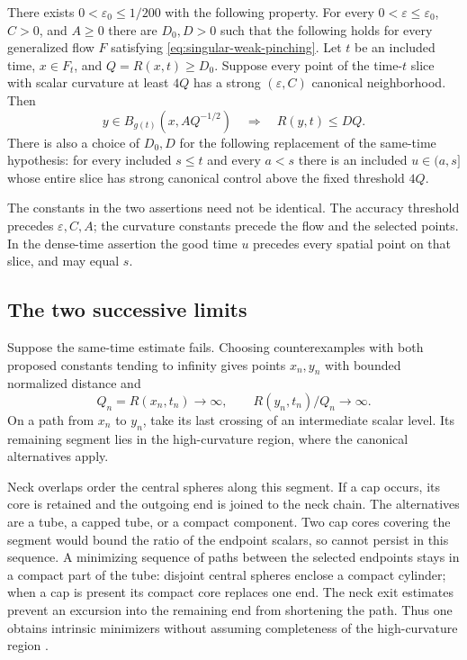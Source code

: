 \begin{theorem}
\label{thm:singular-bounded-distance}
There exists $0<\varepsilon_0\leq1/200$ with the following property.
For every $0<\varepsilon\leq\varepsilon_0$, $C>0$, and $A\geq0$ there
are $D_0,D>0$ such that the following holds for every generalized flow $F$
satisfying \eqref{eq:singular-weak-pinching}. Let $t$ be an included time,
$x\in F_t$, and $Q=R(x,t)\geq D_0$. Suppose every point of the time-$t$
slice with scalar curvature at least $4Q$ has a strong
$(\varepsilon,C)$ canonical neighborhood. Then
\begin{equation}
 y\in B_{g(t)}(x,AQ^{-1/2})\quad\Longrightarrow\quad R(y,t)\leq DQ.
 \label{eq:bounded-distance}
\end{equation}
There is also a choice of $D_0,D$ for the following replacement of the
same-time hypothesis: for every included $s\leq t$ and every $a<s$ there
is an included $u\in(a,s]$ whose entire slice has strong canonical
control above the fixed threshold $4Q$.
\end{theorem}

The constants in the two assertions need not be identical. The accuracy
threshold precedes $\varepsilon,C,A$; the curvature constants precede the
flow and the selected points. In the dense-time assertion the good time
$u$ precedes every spatial point on that slice, and may equal $s$.

\subsection{The two successive limits}

Suppose the same-time estimate fails. Choosing counterexamples with both
proposed constants tending to infinity gives points $x_n,y_n$ with bounded
normalized distance and
\[
 Q_n=R(x_n,t_n)\longrightarrow\infty,\qquad
 R(y_n,t_n)/Q_n\longrightarrow\infty.
\]
On a path from $x_n$ to $y_n$, take its last
crossing of an intermediate scalar level. Its remaining segment lies in the
high-curvature region, where the canonical alternatives apply.

Neck overlaps order the central spheres along this segment. If a cap occurs,
its core is retained and the outgoing end is joined to the neck chain.
The alternatives are a tube, a capped tube, or a compact component. Two cap
cores covering the segment would bound the ratio of the endpoint scalars,
so cannot persist in this sequence. A minimizing sequence of paths between
the selected endpoints stays in a compact part of the tube: disjoint central
spheres enclose a compact cylinder; when a cap is present its compact core
replaces one end. The neck exit estimates prevent an excursion into the
remaining end from shortening the path. Thus one obtains intrinsic
minimizers without assuming completeness of the high-curvature region
\cite[Claims 10.3--10.6, pp. 248--251]{MT2007}.

